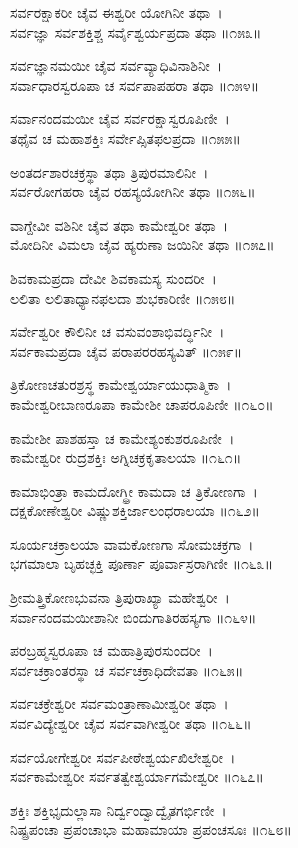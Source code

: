 ಸರ್ವರಕ್ಷಾಕರೀ ಚೈವ ಈಶ್ವರೀ ಯೋಗಿನೀ ತಥಾ~।\\
ಸರ್ವಜ್ಞಾ ಸರ್ವಶಕ್ತಿಶ್ಚ ಸರ್ವೈಶ್ವರ್ಯಪ್ರದಾ ತಥಾ ॥೧೫೩॥

	ಸರ್ವಜ್ಞಾನಮಯೀ ಚೈವ ಸರ್ವವ್ಯಾಧಿವಿನಾಶಿನೀ~।\\
	ಸರ್ವಾಧಾರಸ್ವರೂಪಾ ಚ ಸರ್ವಪಾಪಹರಾ ತಥಾ ॥೧೫೪॥

ಸರ್ವಾನಂದಮಯೀ ಚೈವ ಸರ್ವರಕ್ಷಾಸ್ವರೂಪಿಣೀ~।\\
ತಥೈವ ಚ ಮಹಾಶಕ್ತಿಃ ಸರ್ವೇಪ್ಸಿತಫಲಪ್ರದಾ ॥೧೫೫॥

	ಅಂತರ್ದಶಾರಚಕ್ರಸ್ಥಾ ತಥಾ ತ್ರಿಪುರಮಾಲಿನೀ~।\\
	ಸರ್ವರೋಗಹರಾ ಚೈವ ರಹಸ್ಯಯೋಗಿನೀ ತಥಾ ॥೧೫೬॥

ವಾಗ್ದೇವೀ ವಶಿನೀ ಚೈವ ತಥಾ ಕಾಮೇಶ್ವರೀ ತಥಾ~।\\
ಮೋದಿನೀ ವಿಮಲಾ ಚೈವ ಹ್ಯರುಣಾ ಜಯಿನೀ ತಥಾ ॥೧೫೭॥

	ಶಿವಕಾಮಪ್ರದಾ ದೇವೀ ಶಿವಕಾಮಸ್ಯ ಸುಂದರೀ~।\\
	ಲಲಿತಾ ಲಲಿತಾಧ್ಯಾನಫಲದಾ ಶುಭಕಾರಿಣೀ ॥೧೫೮॥

ಸರ್ವೇಶ್ವರೀ ಕೌಲಿನೀ ಚ ವಸುವಂಶಾಭಿವರ್ದ್ಧಿನೀ~।\\
ಸರ್ವಕಾಮಪ್ರದಾ ಚೈವ ಪರಾಪರರಹಸ್ಯವಿತ್ ॥೧೫೯॥

	ತ್ರಿಕೋಣಚತುರಶ್ರಸ್ಥ ಕಾಮೇಶ್ವರ್ಯಾಯುಧಾತ್ಮಿಕಾ~।\\
	ಕಾಮೇಶ್ವರೀಬಾಣರೂಪಾ ಕಾಮೇಶೀ ಚಾಪರೂಪಿಣೀ ॥೧೬೦॥

ಕಾಮೇಶೀ ಪಾಶಹಸ್ತಾ ಚ ಕಾಮೇಶ್ಯಂಕುಶರೂಪಿಣೀ~।\\
ಕಾಮೇಶ್ವರೀ ರುದ್ರಶಕ್ತಿಃ ಅಗ್ನಿಚಕ್ರಕೃತಾಲಯಾ ॥೧೬೧॥

	ಕಾಮಾಭಿಂತ್ರಾ ಕಾಮದೋಗ್ಧ್ರೀ ಕಾಮದಾ ಚ ತ್ರಿಕೋಣಗಾ~।\\
	ದಕ್ಷಕೋಣೇಶ್ವರೀ ವಿಷ್ಣುಶಕ್ತಿರ್ಜಾಲಂಧರಾಲಯಾ ॥೧೬೨॥

ಸೂರ್ಯಚಕ್ರಾಲಯಾ ವಾಮಕೋಣಗಾ ಸೋಮಚಕ್ರಗಾ~।\\
ಭಗಮಾಲಾ ಬೃಹಚ್ಛಕ್ತಿ ಪೂರ್ಣಾ ಪೂರ್ವಾಸ್ರರಾಗಿಣೀ ॥೧೬೩॥

	ಶ್ರೀಮತ್ತ್ರಿಕೋಣಭುವನಾ ತ್ರಿಪುರಾಖ್ಯಾ ಮಹೇಶ್ವರೀ~।\\
	ಸರ್ವಾನಂದಮಯೀಶಾನೀ ಬಿಂದುಗಾತಿರಹಸ್ಯಗಾ ॥೧೬೪॥

ಪರಬ್ರಹ್ಮಸ್ವರೂಪಾ ಚ ಮಹಾತ್ರಿಪುರಸುಂದರೀ~।\\
ಸರ್ವಚಕ್ರಾಂತರಸ್ಥಾ ಚ ಸರ್ವಚಕ್ರಾಧಿದೇವತಾ ॥೧೬೫॥

	ಸರ್ವಚಕ್ರೇಶ್ವರೀ ಸರ್ವಮಂತ್ರಾಣಾಮೀಶ್ವರೀ ತಥಾ~।\\
	ಸರ್ವವಿದ್ಯೇಶ್ವರೀ ಚೈವ ಸರ್ವವಾಗೀಶ್ವರೀ ತಥಾ ॥೧೬೬॥

ಸರ್ವಯೋಗೇಶ್ವರೀ ಸರ್ವಪೀಠೇಶ್ವರ್ಯಖಿಲೇಶ್ವರೀ~।\\
ಸರ್ವಕಾಮೇಶ್ವರೀ ಸರ್ವತತ್ವೇಶ್ವರ್ಯಾಗಮೇಶ್ವರೀ ॥೧೬೭॥

	ಶಕ್ತಿಃ ಶಕ್ತಿಭೃದುಲ್ಲಾಸಾ ನಿರ್ದ್ವಂದ್ವಾದ್ವೈತಗರ್ಭಿಣೀ~।\\
	ನಿಷ್ಪ್ರಪಂಚಾ ಪ್ರಪಂಚಾಭಾ ಮಹಾಮಾಯಾ ಪ್ರಪಂಚಸೂಃ ॥೧೬೮॥

